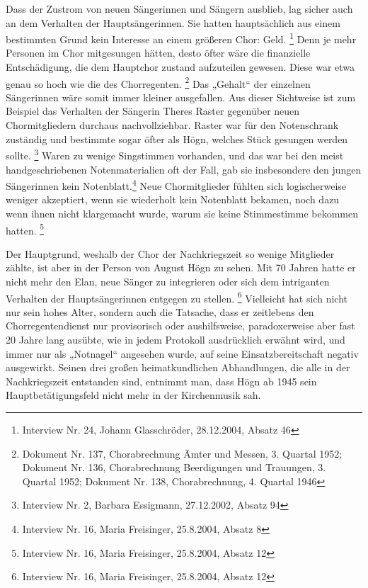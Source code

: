 \begin{figure}
\img{}
\caption{}
\end{figure}

\begin{figure}
\img{}
\caption{}
\end{figure}

Dass der Zustrom von neuen Sängerinnen und Sängern ausblieb, lag sicher
auch an dem Verhalten der Hauptsängerinnen. Sie hatten hauptsächlich
aus einem bestimmten Grund kein Interesse an einem größeren Chor:
Geld. \footnote{Interview Nr. 24, Johann Glasschröder, 28.12.2004,
Absatz 46} Denn je mehr Personen im Chor mitgesungen hätten, desto
öfter wäre die finanzielle Entschädigung, die dem Hauptchor zustand
aufzuteilen gewesen. Diese war etwa genau so hoch wie die des
Chorregenten. \footnote{Dokument Nr. 137, Chorabrechnung Ämter und
Messen, 3. Quartal 1952; Dokument Nr. 136, Chorabrechnung Beerdigungen
und Trauungen, 3. Quartal 1952; Dokument Nr. 138, Chorabrechnung, 4.
Quartal 1946} Das „Gehalt“ der einzelnen Sängerinnen wäre somit immer
kleiner ausgefallen. Aus dieser Sichtweise ist zum Beispiel das
Verhalten der Sängerin Theres Raster gegenüber neuen Chormitgliedern
durchaus nachvollziehbar. Raster war für den Notenschrank zuständig und
bestimmte sogar öfter als Högn, welches Stück gesungen werden
sollte. \footnote{Interview Nr. 2, Barbara Essigmann, 27.12.2002,
Absatz 94} Waren zu wenige Singstimmen vorhanden, und das war bei den
meist handgeschriebenen Notenmaterialien oft der Fall, gab sie
insbesondere den jungen Sängerinnen kein Notenblatt.\footnote{
Interview Nr. 16, Maria Freisinger, 25.8.2004, Absatz 8} Neue
Chormitglieder fühlten sich logischerweise weniger akzeptiert, wenn sie
wiederholt kein Notenblatt bekamen, noch dazu wenn ihnen nicht
klargemacht wurde, warum sie keine Stimmestimme bekommen
hatten. \footnote{Interview Nr. 16, Maria Freisinger, 25.8.2004, Absatz
12}

Der Hauptgrund, weshalb der Chor der Nachkriegszeit so wenige Mitglieder
zählte, ist aber in der Person von August Högn zu sehen. Mit 70 Jahren
hatte er nicht mehr den Elan, neue Sänger zu integrieren oder sich dem
intriganten Verhalten der Hauptsängerinnen entgegen zu
stellen. \footnote{Interview Nr. 16, Maria Freisinger, 25.8.2004,
Absatz 12} Vielleicht hat sich nicht nur sein hohes Alter, sondern auch
die Tatsache, dass er zeitlebens den Chorregentendienst nur
provisorisch oder aushilfsweise, paradoxerweise aber fast 20 Jahre lang
ausübte, wie in jedem Protokoll ausdrücklich erwähnt wird, und immer
nur als „Notnagel“ angesehen wurde, auf seine Einsatzbereitschaft
negativ ausgewirkt. Seinen drei großen heimatkundlichen Abhandlungen,
die alle in der Nachkriegszeit entstanden sind, entnimmt man, dass Högn
ab 1945 sein Hauptbetätigungsfeld nicht mehr in der Kirchenmusik sah.
